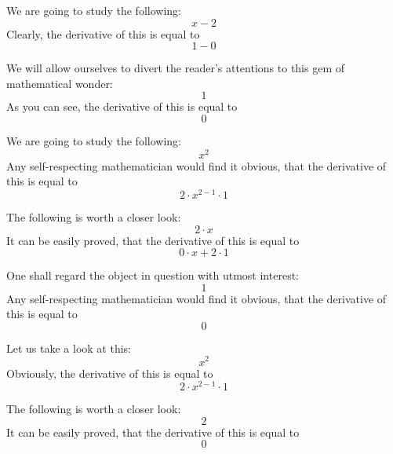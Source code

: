 \documentclass{article}
\begin{document}
We are going to study the following:
\begin{equation}
x - 2 
\end{equation}
Clearly, the derivative of this is equal to
\begin{equation}
1 - 0 
\end{equation}

We will allow ourselves to divert the reader's attentions to this gem of mathematical wonder:
\begin{equation}
1 
\end{equation}
As you can see, the derivative of this is equal to
\begin{equation}
0 
\end{equation}

We are going to study the following:
\begin{equation}
x ^{2 } 
\end{equation}
Any self-respecting mathematician would find it obvious, that the derivative of this is equal to
\begin{equation}
2 \cdot x ^{2 - 1 } \cdot 1 
\end{equation}

The following is worth a closer look:
\begin{equation}
2 \cdot x 
\end{equation}
It can be easily proved, that the derivative of this is equal to
\begin{equation}
0 \cdot x + 2 \cdot 1 
\end{equation}

One shall regard the object in question with utmost interest:
\begin{equation}
1 
\end{equation}
Any self-respecting mathematician would find it obvious, that the derivative of this is equal to
\begin{equation}
0 
\end{equation}

Let us take a look at this:
\begin{equation}
x ^{2 } 
\end{equation}
Obviously, the derivative of this is equal to
\begin{equation}
2 \cdot x ^{2 - 1 } \cdot 1 
\end{equation}

The following is worth a closer look:
\begin{equation}
2 
\end{equation}
It can be easily proved, that the derivative of this is equal to
\begin{equation}
0 
\end{equation}
\end{document}
